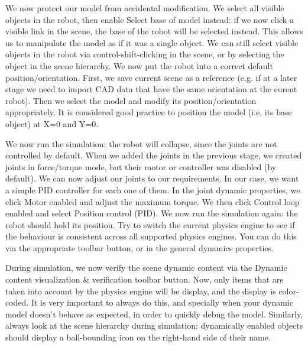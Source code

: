 
We now protect our model from accidental modification. We select all visible 
objects in the robot, then enable Select base of model instead: if we now 
click a visible link in the scene, the base of the robot will be selected 
instead. This allows us to manipulate the model as if it was a single object. 
We can still select visible objects in the robot via control-shift-clicking 
in the scene, or by selecting the object in the scene hierarchy. We now put
the robot into a correct default position/orientation. First, we save current 
scene as a reference (e.g. if at a later stage we need to import CAD data 
that have the same orientation at the curent robot). Then we select the model 
and modify its position/orientation appropriately. It is considered good
practice to position the model (i.e. its base object) at X=0 and Y=0.


We now run the simulation: the robot will collapse, since the joints are not 
controlled by default. When we added the joints in the previous stage, we 
created joints in force/torque mode, but their motor or controller was 
disabled (by default). We can now adjust our joints to our requirements. In
our case, we want a simple PID controller for each one of them. In the joint
dynamic properties, we click Motor enabled and adjust the maximum torque. We
then click Control loop enabled and select Position control (PID). We now run
the simulation again: the robot should hold its position. Try to switch the 
current physics engine to see if the behaviour is consistent across all
supported physics engines. You can do this via the appropriate toolbar button,
or in the general dynamics properties.

During simulation, we now verify the scene dynamic content via the Dynamic 
content visualization \& verification toolbar button. Now, only items that 
are taken into account by the physics engine will be display, and the display
is color-coded. It is very important to always do this, and specially when 
your dynamic model doesn't behave as expected, in order to quickly debug the
model. Similarly, always look at the scene hierarchy during simulation:
dynamically enabled objects should display a ball-bounding icon on the
right-hand side of their name.


